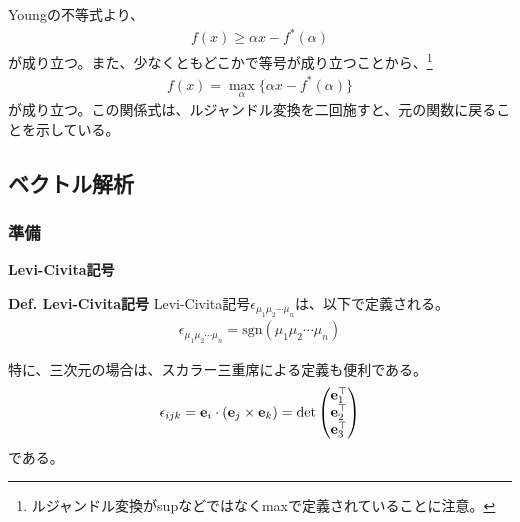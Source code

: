 \documentclass[a4paper,11pt]{jsarticle}
\numberwithin{equation}{section}
\begin{document}
Youngの不等式より、
\begin{align}
  f(x)  \geq \alpha x - f^*(\alpha)
\end{align}
が成り立つ。また、少なくともどこかで等号が成り立つことから、\footnote{ルジャンドル変換がsupなどではなくmaxで定義されていることに注意。}
\begin{align}
  f(x) = \max_{\alpha} \{\alpha x - f^*(\alpha)\}
\end{align}
が成り立つ。この関係式は、ルジャンドル変換を二回施すと、元の関数に戻ることを示している。\\


\subsection{ベクトル解析}
\subsubsection{準備}
\textbf{Levi-Civita記号}\\
\begin{itembox}[l]{\textbf{Def. Levi-Civita記号}}
  Levi-Civita記号$\epsilon_{\mu_{1} \mu_{2} \cdots \mu_{n}}$は、以下で定義される。
  \begin{align}
    \epsilon_{\mu_{1} \mu_{2} \cdots \mu_{n}} = 
    \text{sgn}(\mu_{1} \mu_{2} \cdots \mu_{n})
  \end{align}
\end{itembox}
特に、三次元の場合は、スカラー三重席による定義も便利である。
\begin{align}
  \epsilon_{ijk} = \vb{e}_{i} \cdot (\vb{e}_{j} \times \vb{e}_{k}) = \det 
  \begin{pmatrix}
    \vb{e}_{1} ^\top\\
    \vb{e}_{2} ^\top\\
    \vb{e}_{3} ^\top
  \end{pmatrix}
\end{align}
である。
\end{document}
